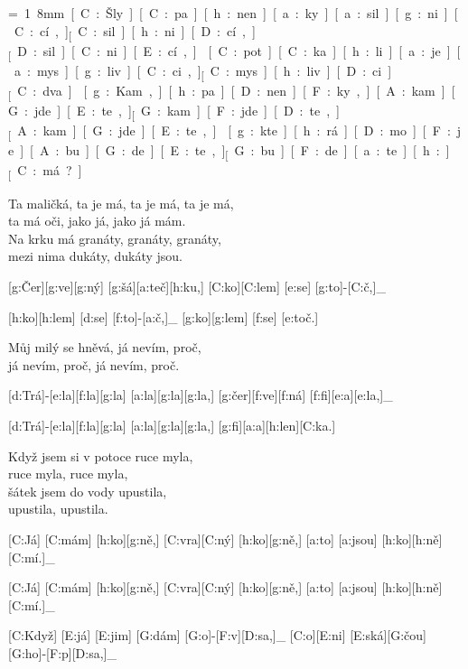 
{\unit=1.8mm
[C:Šly] [C:pa][h:nen][a:ky] [a:sil][g:ni][C:cí,]_ [C:sil][h:ni][D:cí,]_ [D:sil][C:ni][E:cí,]_\

[C:pot][C:ka][h:li] [a:je] [a:mys][g:liv][C:ci,]_ [C:mys][h:liv][D:ci]_ [C:dva.]_\

[g:Kam,] [h:pa][D:nen][F:ky,] [A:kam] [G:jde][E:te,]_ [G:kam] [F:jde][D:te,]_ [A:kam] [G:jde][E:te,]_\

[g:kte][h:rá] [D:mo][F:je] [A:bu][G:de][E:te,]_ [G:bu][F:de][a:te][h:]_ [C:má?]_\
}

Ta maličká, ta je má, ta je má, ta je má,\\
ta má oči, jako já, jako já mám.\\
Na krku má granáty, granáty, granáty,\\
mezi nima dukáty, dukáty jsou.




[g:Čer][g:ve][g:ný] [g:šá][a:teč][h:ku,] [C:ko][C:lem] [e:se] [g:to]-[C:č,]_\

[h:ko][h:lem] [d:se] [f:to]-[a:č,]_ [g:ko][g:lem] [f:se] [e:toč.]\

Můj milý se hněvá, já nevím, proč,\\
já nevím, proč, já nevím, proč.

[d:Trá]-[e:la][f:la][g:la] [a:la][g:la][g:la,] [g:čer][f:ve][f:ná] [f:fi][e:a][e:la,]_\

[d:Trá]-[e:la][f:la][g:la] [a:la][g:la][g:la,] [g:fi][a:a][h:len][C:ka.]\

Když jsem si v potoce ruce myla,\\
ruce myla, ruce myla,\\
šátek jsem do vody upustila,\\
upustila, upustila.



[C:Já] [C:mám] [h:ko][g:ně,] [C:vra][C:ný] [h:ko][g:ně,] [a:to] [a:jsou] [h:ko][h:ně] [C:mí.]_\

[C:Já] [C:mám] [h:ko][g:ně,] [C:vra][C:ný] [h:ko][g:ně,] [a:to] [a:jsou] [h:ko][h:ně] [C:mí.]_\

[C:Když] [E:já] [E:jim] [G:dám] [G:o]-[F:v][D:sa,]_ [C:o][E:ni] [E:ská][G:čou] [G:ho]-[F:p][D:sa,]_\

